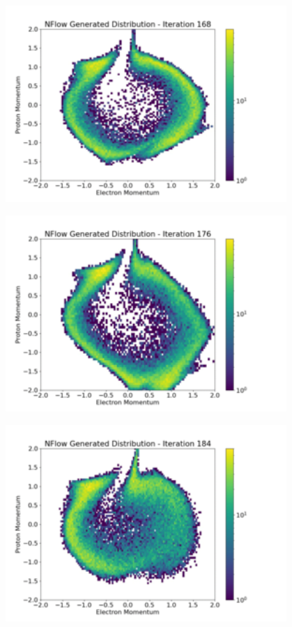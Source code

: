 \documentclass[aspectratio=169]{beamer}
\begin{document}
\begin{frame}[noframenumbering]\centering\includegraphics[width=0.8\textwidth]{images/400training/400training-21.png}\end{frame}
\begin{frame}[noframenumbering]\centering\includegraphics[width=0.8\textwidth]{images/400training/400training-22.png}\end{frame}
\begin{frame}[noframenumbering]\centering\includegraphics[width=0.8\textwidth]{images/400training/400training-23.png}\end{frame}
\end{document}
